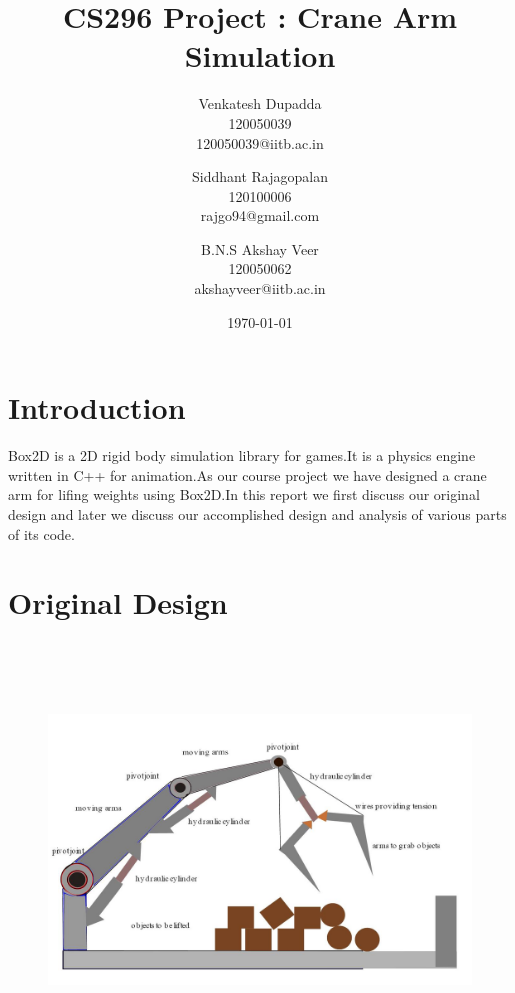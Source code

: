 \documentclass[11pt]{article}
\begin{document}
\title{CS296 Project : Crane Arm Simulation}
\author{Venkatesh Dupadda\\
		120050039\\
		120050039@iitb.ac.in \and
        Siddhant Rajagopalan\\
		120100006\\
		rajgo94@gmail.com \and
		B.N.S Akshay Veer\\
		120050062\\
		akshayveer@iitb.ac.in
		\\}
\date{\today} 
\maketitle

\section{Introduction}
Box2D
\cite{bman} 
is a 2D rigid body simulation library for games.It is a physics engine written in C++ for animation.As our course project we have designed a crane arm for lifing weights using Box2D.In this report we first discuss our original design and later we discuss our accomplished design and analysis of various parts of its code.
\section{Original Design}

\begin{figure}[ht!]
\centering
\includegraphics[height=11cm]{design.jpg}
\end{figure}
\end{document}
